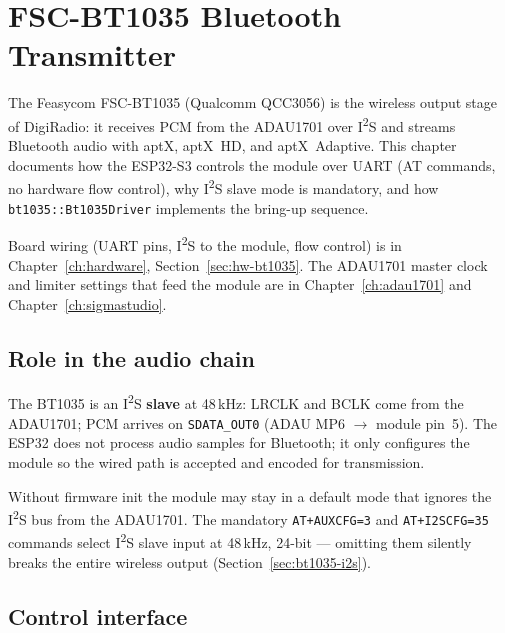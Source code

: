 
\chapter{FSC-BT1035 Bluetooth Transmitter}
\label{ch:bt1035}

The Feasycom FSC-BT1035 (Qualcomm QCC3056) is the wireless output stage of
DigiRadio: it receives PCM from the ADAU1701 over I\textsuperscript{2}S and
streams Bluetooth audio with aptX, aptX~HD, and aptX~Adaptive. This chapter
documents how the ESP32-S3 controls the module over UART (AT commands, no
hardware flow control), why I\textsuperscript{2}S slave mode is mandatory,
and how \texttt{bt1035::Bt1035Driver} implements the bring-up sequence.

\begin{drref}
Board wiring (UART pins, I\textsuperscript{2}S to the module, flow control)
is in Chapter~\ref{ch:hardware}, Section~\ref{sec:hw-bt1035}. The ADAU1701
master clock and limiter settings that feed the module are in
Chapter~\ref{ch:adau1701} and Chapter~\ref{ch:sigmastudio}.
\end{drref}

\section{Role in the audio chain}
\label{sec:bt1035-role}

The BT1035 is an I\textsuperscript{2}S \textbf{slave} at 48\,kHz: LRCLK and
BCLK come from the ADAU1701; PCM arrives on \texttt{SDATA\_OUT0}
(ADAU MP6 $\rightarrow$ module pin~5). The ESP32 does not process audio
samples for Bluetooth; it only configures the module so the wired path is
accepted and encoded for transmission.

Without firmware init the module may stay in a default mode that ignores the
I\textsuperscript{2}S bus from the ADAU1701. The mandatory
\texttt{AT+AUXCFG=3} and \texttt{AT+I2SCFG=35} commands select I\textsuperscript{2}S
slave input at 48\,kHz, 24-bit --- omitting them silently breaks the entire
wireless output (Section~\ref{sec:bt1035-i2s}).

\section{Control interface}
\label{sec:bt1035-uart}

